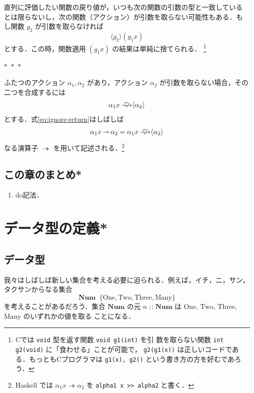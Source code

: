 \documentclass[a5paper,twoside,fleqn,draft]{jsbook}
\newcommand{\separator}{\begin{center}$*$~$*$~$*$\end{center}}
\newcommand{\programminglanguage}[1]{\textsf{#1}}
\newcommand{\clang}{\programminglanguage{C}}
\newcommand{\haskell}{\programminglanguage{Haskell}}
\newcommand{\code}[1]{\texttt{#1}}
\newcommand{\mSpecialConstant}[1]{\textrm{#1}}
\newcommand{\mNumOne}{\mSpecialConstant{One}}
\newcommand{\mNumTwo}{\mSpecialConstant{Two}}
\newcommand{\mNumThree}{\mSpecialConstant{Three}}
\newcommand{\mNumMany}{\mSpecialConstant{Many}}
\DeclareMathOperator{\mBind}{\heartsuit}
\DeclareMathOperator{\mBindRight}{\ooalign{$\longrightarrow$\crcr\hss$\mBind$\hss}}
\DeclareMathOperator{\mBindRightIgnore}{\twoheadrightarrow}
\DeclareMathOperator{\mDefEq}{\stackrel{\mathrm{def}}{=}}
\DeclareMathOperator{\mIn}{{:\!:}}
\newcommand{\mSet}[1]{\mathbf{#1}}
\newcommand{\mFuncWith}[1]{\langle#1\rangle}
\begin{document}
直列に評価したい関数の戻り値が，いつも次の関数の引数の型と一致している
とは限らないし，次の関数（アクション）が引数を取らない可能性もある．も
し関数 $g_2$ が引数を取らなければ
\begin{equation}
\mFuncWith{g_2}(g_1x)
\end{equation}
とする．この時，関数適用 $(g_1x)$ の結果は単純に捨てられる．
\footnote{\clang では \code{void} 型を返す関数 \code{void g1(int)} を引
  数を取らない関数 \code{int g2(void)} に「食わせる」ことが可能で，
  \code{g2(g1(x))} は正しいコードである．もっとも\clang プログラマは
  \code{g1(x), g2()} という書き方の方を好むであろう．}

\separator

ふたつのアクション $\alpha_1,\alpha_2$ があり，アクション $\alpha_2$
が引数を取らない場合，その二つを合成するには
\begin{equation}
\label{eq:ignore-return}
\alpha_1 x\mBindRight\mFuncWith{\alpha_2}
\end{equation}
とする．式\eqref{eq:ignore-return}はしばしば
\begin{equation}
\alpha_1 x\mBindRightIgnore\alpha_2=\alpha_1x\mBindRight\mFuncWith{\alpha_2}
\end{equation}
なる演算子 $\mBindRightIgnore$ を用いて記述される．\footnote{\haskell
  では $\alpha_1x\mBindRightIgnore\alpha_2$ を \code{alpha1 x >>
    alpha2} と書く．}

\section{この章のまとめ*}

\begin{enumerate}
\item do記法．
\end{enumerate}

\chapter{データ型の定義*}
\label{ch:data-type}

\section{データ型}

我々はしばしば新しい集合を考える必要に迫られる．例えば，イチ，ニ，サン，
タクサンからなる集合
\begin{equation}
\mSet{Num}\mDefEq\{\mNumOne,\mNumTwo,\mNumThree,\mNumMany\}
\end{equation}
を考えることがあるだろう．集合 $\mSet{Num}$ の元 $n\mIn\mSet{Num}$ は
$\mNumOne$, $\mNumTwo$, $\mNumThree$, $\mNumMany$ のいずれかの値を取る
ことになる．
\end{document}
